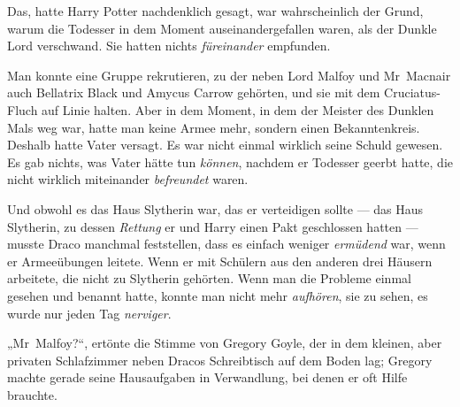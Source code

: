 Das, hatte Harry Potter nachdenklich gesagt, war wahrscheinlich der Grund, warum die Todesser in dem Moment auseinandergefallen waren, als der Dunkle Lord verschwand. Sie hatten nichts \emph{füreinander} empfunden.

Man konnte eine Gruppe rekrutieren, zu der neben Lord Malfoy und Mr~Macnair auch Bellatrix Black und Amycus Carrow gehörten, und sie mit dem Cruciatus-Fluch auf Linie halten. Aber in dem Moment, in dem der Meister des Dunklen Mals weg war, hatte man keine Armee mehr, sondern einen Bekanntenkreis. Deshalb hatte Vater versagt. Es war nicht einmal wirklich seine Schuld gewesen. Es gab nichts, was Vater hätte tun \emph{können}, nachdem er Todesser geerbt hatte, die nicht wirklich miteinander \emph{befreundet} waren.

Und obwohl es das Haus Slytherin war, das er verteidigen sollte — das Haus Slytherin, zu dessen \emph{Rettung} er und Harry einen Pakt geschlossen hatten — musste Draco manchmal feststellen, dass es einfach weniger \emph{ermüdend} war, wenn er Armeeübungen leitete. Wenn er mit Schülern aus den anderen drei Häusern arbeitete, die nicht zu Slytherin gehörten. Wenn man die Probleme einmal gesehen und benannt hatte, konnte man nicht mehr \emph{aufhören}, sie zu sehen, es wurde nur jeden Tag \emph{nerviger}.

„Mr~Malfoy?“, ertönte die Stimme von Gregory Goyle, der in dem kleinen, aber privaten Schlafzimmer neben Dracos Schreibtisch auf dem Boden lag; Gregory machte gerade seine Hausaufgaben in Verwandlung, bei denen er oft Hilfe brauchte.

